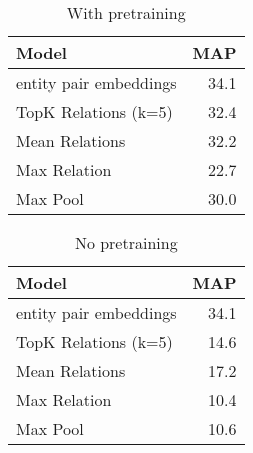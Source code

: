 %

\begin{table}[h!]
\setlength{\tabcolsep}{4.1pt}
\begin{center}
\begin{tabular}{|lr|}
\hline
\bf Model & MAP \\
\hline\hline
entity pair embeddings      & 34.1 \\
\hline
TopK Relations (k=5)       & 32.4  \\
Mean Relations              & 32.2 \\
Max Relation                & 22.7  \\
Max Pool                    & 30.0 \\
\hline

\hline
\end{tabular}
\caption{With pretraining
\label{distant-supervision-table}}
\end{center}
\vspace{-.3cm}
\end{table}


\begin{table}[h!]
\setlength{\tabcolsep}{4.1pt}
\begin{center}
\begin{tabular}{|lr|}
\hline
\bf Model & MAP \\
\hline\hline
entity pair embeddings      & 34.1 \\
\hline
TopK Relations (k=5)       & 14.6  \\
Mean Relations              & 17.2 \\
Max Relation                & 10.4  \\
Max Pool                    & 10.6 \\
\hline

\hline
\end{tabular}
\caption{No pretraining
\label{tab:no-pretrain}}
\end{center}
\vspace{-.3cm}
\end{table}
